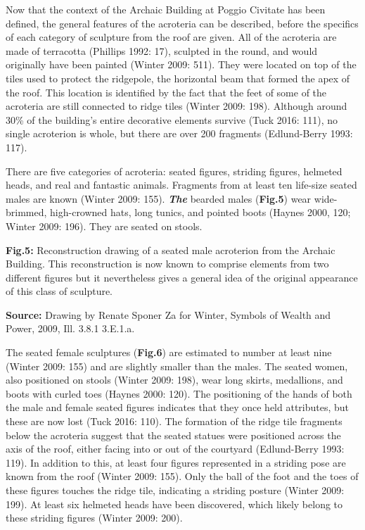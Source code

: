 Now that the context of the Archaic Building at Poggio Civitate has been
defined, the general features of the acroteria can be described, before
the specifics of each category of sculpture from the roof are given. All
of the acroteria are made of terracotta (Phillips 1992: 17), sculpted in
the round, and would originally have been painted (Winter 2009: 511).
They were located on top of the tiles used to protect the ridgepole, the
horizontal beam that formed the apex of the roof. This location is
identified by the fact that the feet of some of the acroteria are still
connected to ridge tiles (Winter 2009: 198). Although around 30\% of the
building's entire decorative elements survive (Tuck 2016: 111), no
single acroterion is whole, but there are over 200 fragments
(Edlund-Berry 1993: 117).

There are five categories of acroteria: seated figures, striding
figures, helmeted heads, and real and fantastic animals. Fragments from
at least ten life-size seated males are known (Winter 2009: 155).
\textbf{\emph{The}} bearded males (\textbf{Fig.5}) wear wide-brimmed,
high-crowned hats, long tunics, and pointed boots (Haynes 2000, 120;
Winter 2009: 196). They are seated on stools.

\textbf{Fig.5:} Reconstruction drawing of a seated male acroterion from
the Archaic Building. This reconstruction is now known to comprise
elements from two different figures but it nevertheless gives a general
idea of the original appearance of this class of sculpture.

\textbf{Source:} Drawing by Renate Sponer Za for Winter, Symbols of
Wealth and Power, 2009, Ill. 3.8.1 3.E.1.a.

The seated female sculptures (\textbf{Fig.6}) are estimated to number at
least nine (Winter 2009: 155) and are slightly smaller than the males.
The seated women, also positioned on stools (Winter 2009: 198), wear
long skirts, medallions, and boots with curled toes (Haynes 2000: 120).
The positioning of the hands of both the male and female seated figures
indicates that they once held attributes, but these are now lost (Tuck
2016: 110). The formation of the ridge tile fragments below the
acroteria suggest that the seated statues were positioned across the
axis of the roof, either facing into or out of the courtyard
(Edlund-Berry 1993: 119). In addition to this, at least four figures
represented in a striding pose are known from the roof (Winter 2009:
155). Only the ball of the foot and the toes of these figures touches
the ridge tile, indicating a striding posture (Winter 2009: 199). At
least six helmeted heads have been discovered, which likely belong to
these striding figures (Winter 2009: 200).

